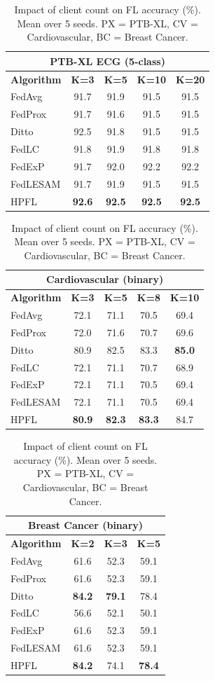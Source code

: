 \documentclass[conference,a4paper]{IEEEtran}
\begin{document}
\begin{table}[t]
\centering
\caption{Impact of client count on FL accuracy (\%). Mean over 5 seeds. PX = PTB-XL, CV = Cardiovascular, BC = Breast Cancer.}
\label{tab:client_scaling}
\small
\begin{tabular}{lcccc}
\toprule
\multicolumn{5}{c}{\textbf{PTB-XL ECG (5-class)}} \\
\midrule
\textbf{Algorithm} & \textbf{K=3} & \textbf{K=5} & \textbf{K=10} & \textbf{K=20} \\
\midrule
FedAvg & 91.7 & 91.9 & 91.5 & 91.5 \\
FedProx & 91.7 & 91.6 & 91.5 & 91.5 \\
Ditto & 92.5 & 91.8 & 91.5 & 91.5 \\
FedLC & 91.8 & 91.9 & 91.8 & 91.8 \\
FedExP & 91.7 & 92.0 & 92.2 & 92.2 \\
FedLESAM & 91.7 & 91.9 & 91.5 & 91.5 \\
HPFL & \textbf{92.6} & \textbf{92.5} & \textbf{92.5} & \textbf{92.5} \\
\bottomrule
\end{tabular}
\hspace{3mm}
\begin{tabular}{lcccc}
\toprule
\multicolumn{5}{c}{\textbf{Cardiovascular (binary)}} \\
\midrule
\textbf{Algorithm} & \textbf{K=3} & \textbf{K=5} & \textbf{K=8} & \textbf{K=10} \\
\midrule
FedAvg & 72.1 & 71.1 & 70.5 & 69.4 \\
FedProx & 72.0 & 71.6 & 70.7 & 69.6 \\
Ditto & 80.9 & 82.5 & 83.3 & \textbf{85.0} \\
FedLC & 72.1 & 71.1 & 70.7 & 68.9 \\
FedExP & 72.1 & 71.1 & 70.5 & 69.4 \\
FedLESAM & 72.1 & 71.1 & 70.5 & 69.4 \\
HPFL & \textbf{80.9} & \textbf{82.3} & \textbf{83.3} & 84.7 \\
\bottomrule
\end{tabular}
\hspace{3mm}
\begin{tabular}{lccc}
\toprule
\multicolumn{4}{c}{\textbf{Breast Cancer (binary)}} \\
\midrule
\textbf{Algorithm} & \textbf{K=2} & \textbf{K=3} & \textbf{K=5} \\
\midrule
FedAvg & 61.6 & 52.3 & 59.1 \\
FedProx & 61.6 & 52.3 & 59.1 \\
Ditto & \textbf{84.2} & \textbf{79.1} & 78.4 \\
FedLC & 56.6 & 52.1 & 50.1 \\
FedExP & 61.6 & 52.3 & 59.1 \\
FedLESAM & 61.6 & 52.3 & 59.1 \\
HPFL & \textbf{84.2} & 74.1 & \textbf{78.4} \\
\bottomrule
\end{tabular}
\end{table}
\end{document}
